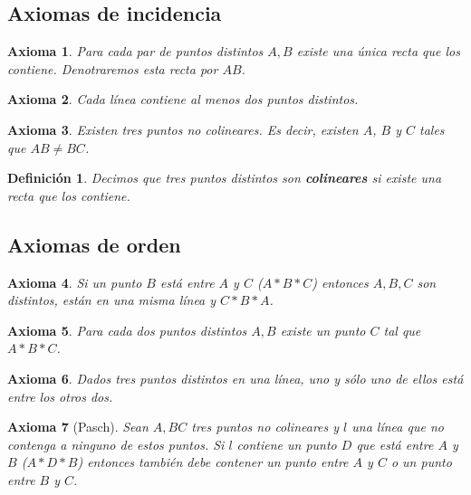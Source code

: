 \documentclass[12pt, spanish]{article}
\newtheorem*{defin}{Definición}
\def\theaxsection{}
\newcommand{\setaxsection}[1]{\def\theaxsection{#1}\setcounter{ax}{0}}
\theoremstyle{axstyle}
\newtheorem{ax}{Axioma}
\theoremstyle{axbstyle}
\begin{document}
\subsection{Axiomas de incidencia}
\setaxsection{I}

\begin{ax}\label{I1}
    Para cada par de puntos distintos $A, B$ existe una única recta que los
    contiene. Denotraremos esta recta por $AB$.
\end{ax}

\begin{ax}\label{I2}
    Cada línea contiene al menos dos puntos distintos.
\end{ax}

\begin{ax}\label{I3}
   Existen tres puntos no colineares. Es decir, existen $A$, $B$ y $C$ tales que
   $AB\neq BC$.
\end{ax}

\begin{defin}
  Decimos que tres puntos distintos son \textbf{colineares} si existe una recta 
  que los contiene.
\end{defin}

\subsection{Axiomas de orden}
\setaxsection{B}

\begin{ax}\label{B1}
  Si un punto $B$ está entre $A$ y $C$ ($A * B * C$) entonces $A, B, C$ son
  distintos, están en una misma línea y $C * B * A$.
\end{ax}

\begin{ax}\label{B2}
  Para cada dos puntos distintos $A,B$ existe un punto $C$ tal que $A * B * C$.
\end{ax}

\begin{ax}\label{B3}
  Dados tres puntos distintos en una línea, uno y sólo uno de ellos está entre
  los otros dos.
\end{ax}

\begin{ax}[Pasch]\label{B4} 
  Sean $A, B C$ tres puntos no colineares y $l$ una línea que no contenga a 
  ninguno de estos puntos. Si $l$ contiene un punto $D$ que está entre $A$ y $B$ 
  ($A * D * B$) entonces también debe contener un punto entre $A$ y $C$ o un
  punto entre $B$ y $C$.
\end{ax}
\end{document}
